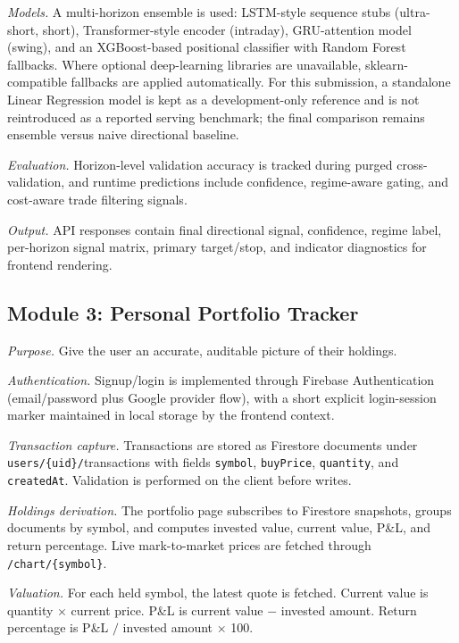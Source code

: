 \documentclass[12pt,a4paper]{report}
\numberwithin{equation}{chapter}
\begin{document}
\textit{Models.} A multi-horizon ensemble is used: LSTM-style sequence stubs (ultra-short, short), Transformer-style encoder (intraday), GRU-attention model (swing), and an XGBoost-based positional classifier with Random Forest fallbacks. Where optional deep-learning libraries are unavailable, sklearn-compatible fallbacks are applied automatically.
For this submission, a standalone Linear Regression model is kept as a development-only reference and is not reintroduced as a reported serving benchmark; the final comparison remains ensemble versus naive directional baseline.

\textit{Evaluation.} Horizon-level validation accuracy is tracked during purged cross-validation, and runtime predictions include confidence, regime-aware gating, and cost-aware trade filtering signals.

\textit{Output.} API responses contain final directional signal, confidence, regime label, per-horizon signal matrix, primary target/stop, and indicator diagnostics for frontend rendering.

\subsection{Module 3: Personal Portfolio Tracker}

\textit{Purpose.} Give the user an accurate, auditable picture of their holdings.

\textit{Authentication.} Signup/login is implemented through Firebase Authentication (email/password plus Google provider flow), with a short explicit login-session marker maintained in local storage by the frontend context.

\textit{Transaction capture.} Transactions are stored as Firestore documents under \texttt{users/\{uid\}/}transactions with fields \texttt{symbol}, \texttt{buyPrice}, \texttt{quantity}, and \texttt{createdAt}. Validation is performed on the client before writes.

\textit{Holdings derivation.} The portfolio page subscribes to Firestore snapshots, groups documents by symbol, and computes invested value, current value, P\&L, and return percentage. Live mark-to-market prices are fetched through \texttt{/chart/\{symbol\}}.

\textit{Valuation.} For each held symbol, the latest quote is fetched. Current value is quantity $\times$ current price. P\&L is current value $-$ invested amount. Return percentage is P\&L $/$ invested amount $\times$ 100.
\end{document}
